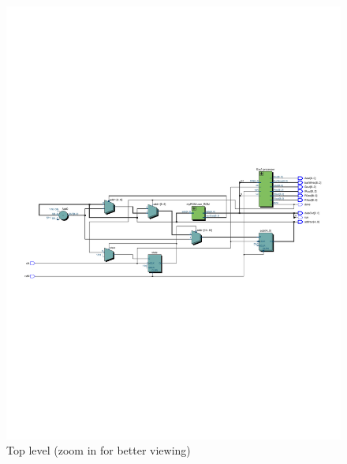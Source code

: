 \documentclass[13pt,a4paper]{report}
\begin{document}
\begin{figure}[H]
\centering
\includegraphics[scale=0.9, clip, trim={1cm 10cm 1cm 10cm}]{images/Exc2_RTL.pdf}
\caption*{Top level (zoom in for better viewing)}
\end{figure}
\end{document}
